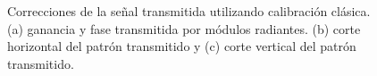 \begin{figure}[H]
	\centering

	\caption{Correcciones de la señal transmitida utilizando calibración clásica. (a) ganancia y fase transmitida por módulos
		radiantes. (b) corte horizontal del patrón transmitido y (c) corte vertical del patrón transmitido.}
	\label{fig:nonErrClassical10degCol}
\end{figure}

